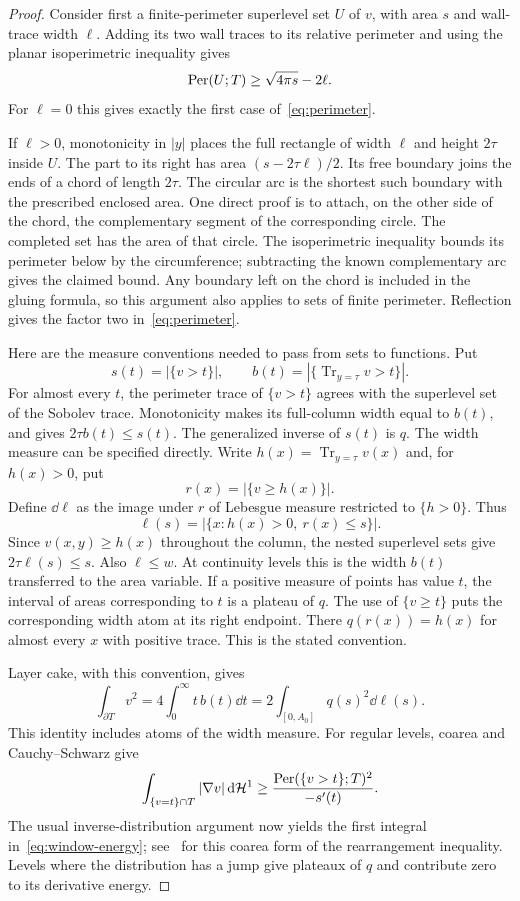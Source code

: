 \begin{proof}
Consider first a finite-perimeter superlevel set $U$ of $v$, with area $s$ and wall-trace width $\ell$. Adding its two wall traces to its relative perimeter and using the planar isoperimetric inequality gives
\[
 \operatorname{Per}(U;T)\ge\sqrt{4\pi s}-2\ell.
\]
For $\ell=0$ this gives exactly the first case of~\eqref{eq:perimeter}.

If $\ell>0$, monotonicity in $|y|$ places the full rectangle of width $\ell$ and height $2\tau$ inside $U$. The part to its right has area $(s-2\tau\ell)/2$. Its free boundary joins the ends of a chord of length $2\tau$. The circular arc is the shortest such boundary with the prescribed enclosed area. One direct proof is to attach, on the other side of the chord, the complementary segment of the corresponding circle. The completed set has the area of that circle. The isoperimetric inequality bounds its perimeter below by the circumference; subtracting the known complementary arc gives the claimed bound. Any boundary left on the chord is included in the gluing formula, so this argument also applies to sets of finite perimeter. Reflection gives the factor two in~\eqref{eq:perimeter}.

Here are the measure conventions needed to pass from sets to functions. Put
\[
 s(t)=|\{v>t\}|,\qquad b(t)=|\{\operatorname{Tr}_{y=\tau}v>t\}|.
\]
For almost every $t$, the perimeter trace of $\{v>t\}$ agrees with the superlevel set of the Sobolev trace. Monotonicity makes its full-column width equal to $b(t)$, and gives $2\tau b(t)\le s(t)$. The generalized inverse of $s(t)$ is $q$. The width measure can be specified directly. Write $h(x)=\operatorname{Tr}_{y=\tau}v(x)$ and, for $h(x)>0$, put
\[
 r(x)=|\{v\ge h(x)\}|.
\]
Define $\dd\ell$ as the image under $r$ of Lebesgue measure restricted to $\{h>0\}$. Thus
\[
 \ell(s)=|\{x:h(x)>0,\ r(x)\le s\}|.
\]
Since $v(x,y)\ge h(x)$ throughout the column, the nested superlevel sets give $2\tau\ell(s)\le s$. Also $\ell\le w$. At continuity levels this is the width $b(t)$ transferred to the area variable. If a positive measure of points has value $t$, the interval of areas corresponding to $t$ is a plateau of $q$. The use of $\{v\ge t\}$ puts the corresponding width atom at its right endpoint. There $q(r(x))=h(x)$ for almost every $x$ with positive trace. This is the stated convention.

Layer cake, with this convention, gives
\[
 \int_{\partial T}v^2
 =4\int_0^\infty t\,b(t)\dd t
 =2\int_{[0,A_0]}q(s)^2\dd\ell(s).
\]
This identity includes atoms of the width measure. For regular levels, coarea and Cauchy--Schwarz give
\[
 \int_{\{v=t\}\cap T}|\nabla v|\,\mathrm d\mathcal H^1
 \ge\frac{\operatorname{Per}(\{v>t\};T)^2}{-s'(t)}.
\]
The usual inverse-distribution argument now yields the first integral in~\eqref{eq:window-energy}; see~\cite{Talenti,BrothersZiemer} for this coarea form of the rearrangement inequality. Levels where the distribution has a jump give plateaux of $q$ and contribute zero to its derivative energy.


\end{proof}
